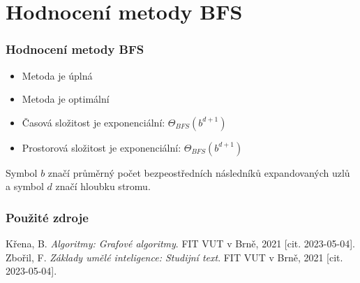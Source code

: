 \documentclass{beamer}
\begin{document}
\section{Hodnocení metody BFS}
\begin{frame}\frametitle{Hodnocení metody BFS}
    \begin{itemize}
        \item Metoda je úplná
        \item Metoda je optimální
        \item Časová složitost je exponenciální: $\Theta_{BFS}(b^{d+1})$
        \item Prostorová složitost je exponenciální: $\Theta_{BFS}(b^{d+1})$
    \end{itemize}
    Symbol $b$ značí průměrný počet bezpeostředních následníků expandovaných uzlů a symbol $d$ značí hloubku stromu.
\end{frame}

\begin{frame}\frametitle{Použité zdroje}
    \begin{thebibliography}{2}
            Křena, B. \emph{Algoritmy: Grafové algoritmy}. FIT VUT v Brně, 2021 [cit. 2023-05-04].
            Zbořil, F. \emph{Základy umělé inteligence: Studijní text}. FIT VUT v Brně, 2021 [cit. 2023-05-04].
    \end{thebibliography}
\end{frame}
\end{document}
